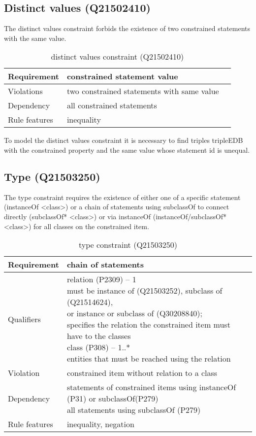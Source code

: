 \documentclass[hyperref,bachelorofscience]{cgvpub}
\begin{document}
\subsection{Distinct values (Q21502410)}
The distinct values constraint forbids the existence of two constrained statements with the same value.
\begin{table}[H]
\caption{distinct values constraint (Q21502410)}
\begin{tabularx}{\textwidth}{ ll X}
\hline
Requirement & constrained statement value \\
\hline
Violations & two constrained statements with same value \\
\hline
Dependency & all constrained statements\\
\hline
Rule features & inequality \\
\hline
\end{tabularx}
\end{table}
To model the distinct values constraint it is necessary to find triples tripleEDB with the constrained property and the same value whose statement id is unequal.

\subsection{Type (Q21503250)}\label{subsec_type}
The type constraint requires the existence of either one of a specific statement (instanceOf <class>) or a chain of statements using subclassOf to connect directly (subclassOf* <class>)
or via instanceOf (instanceOf/subclassOf* <class>) for all classes on the constrained item.
\begin{table}[H]
\caption{type constraint (Q21503250)}
\begin{tabularx}{\textwidth}{ ll X}
\hline
Requirement & chain of statements \\
\hline
Qualifiers & \makecell{relation (P2309) -- 1 \\ must be instance of (Q21503252), subclass of (Q21514624), \\ or instance or subclass of (Q30208840); \\ specifies the relation the constrained item must have to the classes\\
class (P308) -- 1..* \\ entities that must be reached using the relation} \\
\hline
Violation & constrained item without relation to a class \\
\hline
Dependency & \makecell{statements of constrained items using instanceOf (P31) or subclassOf(P279) \\ all statements using subclassOf (P279) }\\
\hline
Rule features & inequality, negation \\
\hline
\end{tabularx}
\end{table}
\end{document}
